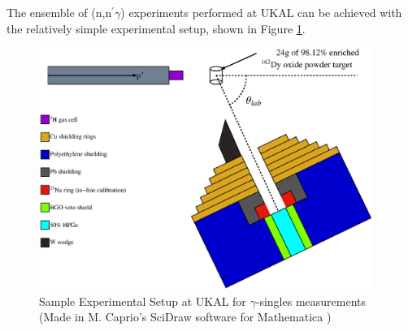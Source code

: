 The ensemble of (n,n$^\prime\gamma$) experiments performed at UKAL can be achieved with the relatively simple experimental setup, shown in Figure \ref{fig:ExpSetup}.

\begin{figure}[h!] 
\begin{center}
\includegraphics[width=0.97\textwidth]{figures/SciDraw_ExpSetup_Dy.eps}
\caption{Sample Experimental Setup at UKAL for $\gamma$-singles measurements (Made in M. Caprio's SciDraw software for Mathematica \cite{Caprio2005107})}
\label{fig:ExpSetup}
\end{center}
\end{figure}


